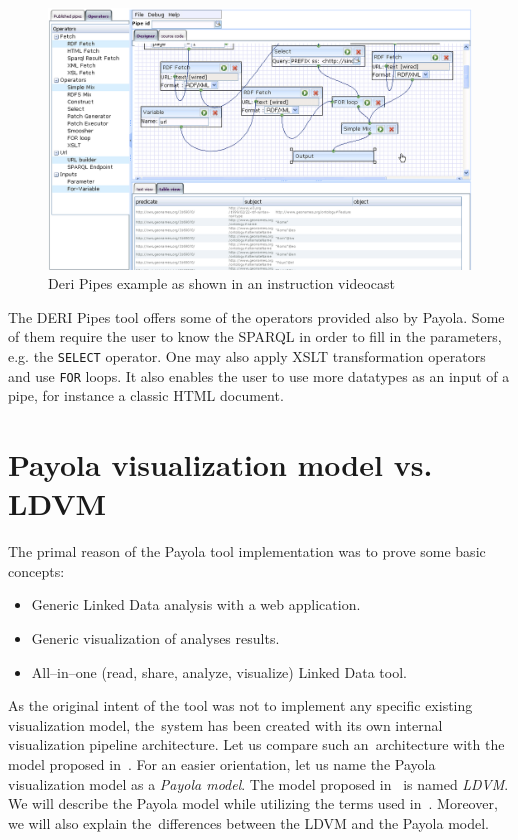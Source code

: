 \begin{figure}
	\centering
	\includegraphics[width=140mm]{img/deri.png}
	\caption{Deri Pipes example as shown in an instruction videocast~\cite{deri-screen-source}}
	\label{fig:deri}
\end{figure}

The DERI Pipes tool offers some of the operators provided also by Payola. Some 
of them require the user to know the SPARQL in order to fill in the 
parameters, e.g. the \texttt{SELECT} operator. One may also apply XSLT 
transformation operators and use \texttt{FOR} loops. It also enables the user to use more datatypes as an input 
of a pipe, for instance a classic HTML document.

\section{Payola visualization model vs. LDVM}
\label{sec:rw:ldvm}
The primal reason of the Payola tool implementation was to prove some basic concepts:

\begin{itemize}
\item Generic Linked Data analysis with a web application.
\item Generic visualization of analyses results.
\item All--in--one (read, share, analyze, visualize) Linked Data tool.
\end{itemize}

As the original intent of the tool was not to implement any specific existing visualization model,
the~system has been created with its own internal visualization pipeline architecture. Let us compare such
an~architecture with the model proposed in~\cite{ldvm}. For an easier orientation, let us name the Payola visualization 
model as a \emph{Payola model}. The model proposed in~\cite{ldvm} is named \emph{LDVM}. We will describe the Payola
model while utilizing the terms used in~\cite{ldvm}. Moreover, we will also explain
the~differences between the LDVM and the Payola model.

